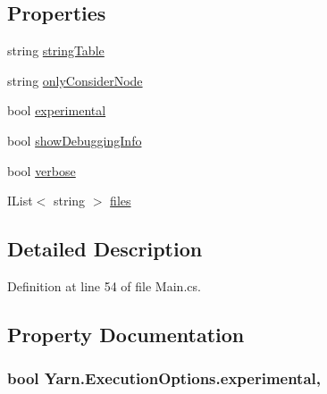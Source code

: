 \subsection*{Properties}
\begin{DoxyCompactItemize}
\item 
string \hyperlink{a00103_a7e43c3b73722956cb0f5d507e4eef527}{string\-Table}
\item 
string \hyperlink{a00103_af4c0062a1d46281d377f87084fde374e}{only\-Consider\-Node}
\item 
bool \hyperlink{a00103_ad97950e47ce2aaeb598295b7c3c44b13}{experimental}
\item 
bool \hyperlink{a00041_a89964ea17bd19caf00cb5bff563ed01c}{show\-Debugging\-Info}
\item 
bool \hyperlink{a00041_ada4d83d1756918f362d55f6649b82b17}{verbose}
\item 
I\-List$<$ string $>$ \hyperlink{a00041_aa93cbb1bc1d5328e0a417012621e92d2}{files}
\end{DoxyCompactItemize}


\subsection{Detailed Description}


Definition at line 54 of file Main.\-cs.



\subsection{Property Documentation}
\hypertarget{a00103_ad97950e47ce2aaeb598295b7c3c44b13}{
\subsubsection[{experimental}]{\setlength{\rightskip}{0pt plus 5cm}bool Yarn.\-Execution\-Options.\-experimental\hspace{0.3cm}{\ttfamily [get]}, {\ttfamily [set]}}}\label{a00103_ad97950e47ce2aaeb598295b7c3c44b13}


